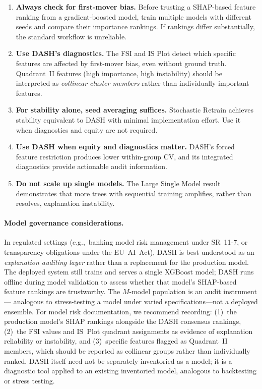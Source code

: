 \documentclass[11pt]{article}
\newcommand{\dash}{\textsc{DASH}}
\newcommand{\eg}{e.g.,\ }
\begin{document}
\begin{enumerate}
  \item \textbf{Always check for first-mover bias.} Before trusting a
    SHAP-based feature ranking from a gradient-boosted model, train
    multiple models with different seeds and compare their importance
    rankings. If rankings differ substantially, the standard workflow
    is unreliable.
  \item \textbf{Use \dash{}'s diagnostics.} The FSI and IS Plot detect
    which specific features are affected by first-mover bias, even
    without ground truth. Quadrant~II features (high importance, high
    instability) should be interpreted as \emph{collinear cluster
    members} rather than individually important features.
  \item \textbf{For stability alone, seed averaging suffices.}
    Stochastic Retrain achieves stability equivalent to \dash{} with
    minimal implementation effort. Use it when diagnostics and equity
    are not required.
  \item \textbf{Use \dash{} when equity and diagnostics matter.}
    \dash{}'s forced feature restriction produces lower within-group
    CV, and its integrated diagnostics provide actionable audit
    information.
  \item \textbf{Do not scale up single models.} The Large Single Model
    result demonstrates that more trees with sequential training
    amplifies, rather than resolves, explanation instability.
\end{enumerate}

\paragraph{Model governance considerations.}
In regulated settings (\eg banking model risk management under SR~11-7,
or transparency obligations under the EU~AI~Act), \dash{} is best
understood as an \emph{explanation auditing layer} rather than a
replacement for the production model. The deployed system still trains
and serves a single XGBoost model; \dash{} runs offline during model
validation to assess whether that model's SHAP-based feature rankings
are trustworthy. The $M$-model population is an audit instrument---
analogous to stress-testing a model under varied specifications---not a
deployed ensemble. For model risk documentation, we recommend recording:
(1)~the production model's SHAP rankings alongside the \dash{} consensus
rankings, (2)~the FSI values and IS~Plot quadrant assignments as evidence
of explanation reliability or instability, and (3)~specific features
flagged as Quadrant~II members, which should be reported as collinear
groups rather than individually ranked.
\dash{} itself need not be separately inventoried as a model; it is a
diagnostic tool applied to an existing inventoried model, analogous to
backtesting or stress testing.
\end{document}

